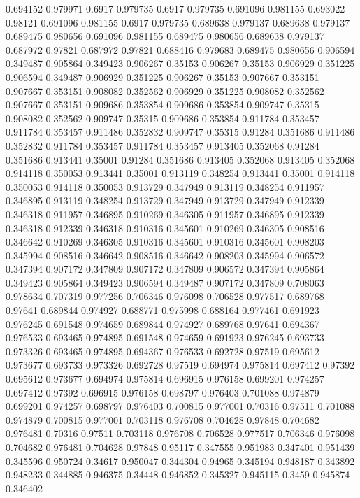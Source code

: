 0.694152 0.979971
0.6917 0.979735
0.6917 0.979735
0.691096 0.981155
0.693022 0.98121
0.691096 0.981155
0.6917 0.979735
0.689638 0.979137
0.689638 0.979137
0.689475 0.980656
0.691096 0.981155
0.689475 0.980656
0.689638 0.979137
0.687972 0.97821
0.687972 0.97821
0.688416 0.979683
0.689475 0.980656
0.906594 0.349487
0.905864 0.349423
0.906267 0.35153
0.906267 0.35153
0.906929 0.351225
0.906594 0.349487
0.906929 0.351225
0.906267 0.35153
0.907667 0.353151
0.907667 0.353151
0.908082 0.352562
0.906929 0.351225
0.908082 0.352562
0.907667 0.353151
0.909686 0.353854
0.909686 0.353854
0.909747 0.35315
0.908082 0.352562
0.909747 0.35315
0.909686 0.353854
0.911784 0.353457
0.911784 0.353457
0.911486 0.352832
0.909747 0.35315
0.91284 0.351686
0.911486 0.352832
0.911784 0.353457
0.911784 0.353457
0.913405 0.352068
0.91284 0.351686
0.913441 0.35001
0.91284 0.351686
0.913405 0.352068
0.913405 0.352068
0.914118 0.350053
0.913441 0.35001
0.913119 0.348254
0.913441 0.35001
0.914118 0.350053
0.914118 0.350053
0.913729 0.347949
0.913119 0.348254
0.911957 0.346895
0.913119 0.348254
0.913729 0.347949
0.913729 0.347949
0.912339 0.346318
0.911957 0.346895
0.910269 0.346305
0.911957 0.346895
0.912339 0.346318
0.912339 0.346318
0.910316 0.345601
0.910269 0.346305
0.908516 0.346642
0.910269 0.346305
0.910316 0.345601
0.910316 0.345601
0.908203 0.345994
0.908516 0.346642
0.908516 0.346642
0.908203 0.345994
0.906572 0.347394
0.907172 0.347809
0.907172 0.347809
0.906572 0.347394
0.905864 0.349423
0.905864 0.349423
0.906594 0.349487
0.907172 0.347809
0.708063 0.978634
0.707319 0.977256
0.706346 0.976098
0.706528 0.977517
0.689768 0.97641
0.689844 0.974927
0.688771 0.975998
0.688164 0.977461
0.691923 0.976245
0.691548 0.974659
0.689844 0.974927
0.689768 0.97641
0.694367 0.976533
0.693465 0.974895
0.691548 0.974659
0.691923 0.976245
0.693733 0.973326
0.693465 0.974895
0.694367 0.976533
0.692728 0.97519
0.695612 0.973677
0.693733 0.973326
0.692728 0.97519
0.694974 0.975814
0.697412 0.97392
0.695612 0.973677
0.694974 0.975814
0.696915 0.976158
0.699201 0.974257
0.697412 0.97392
0.696915 0.976158
0.698797 0.976403
0.701088 0.974879
0.699201 0.974257
0.698797 0.976403
0.700815 0.977001
0.70316 0.97511
0.701088 0.974879
0.700815 0.977001
0.703118 0.976708
0.704628 0.97848
0.704682 0.976481
0.70316 0.97511
0.703118 0.976708
0.706528 0.977517
0.706346 0.976098
0.704682 0.976481
0.704628 0.97848
0.95117 0.347555
0.951983 0.347401
0.951439 0.345596
0.950724 0.34617
0.950047 0.344304
0.94965 0.345194
0.948187 0.343892
0.948233 0.344885
0.946375 0.34448
0.946852 0.345327
0.945115 0.3459
0.945874 0.346402
